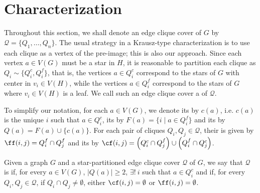 \section{Characterization}

Throughout this section, we shall denote an edge clique cover of $G$ by $\mathcal{Q} = \{Q_1, \dots, Q_n\}$.
The usual strategy in a Krausz-type characterization is to use each clique as a vertex of the pre-image; this is also our approach.
Since each vertex $a \in V(G)$ must be a star in $H$, it is reasonable to partition each clique as $Q_i \sim \{Q_i^c, Q_i^f\}$, that is, the vertices $a \in Q_i^c$ correspond to the stars of $G$ with center in $v_i \in V(H)$, while the vertices $a \in Q_i^f$ correspond to the stars of $G$ where $v_i \in V(H)$ is a leaf.
We call such an edge clique cover a  of $\mathcal{Q}$.

To simplify our notation, for each $a \in V(G)$, we denote its  by $c(a)$, i.e. $c(a)$ is the unique $i$ such that $a \in Q_i^c$, its  by $F(a) = \{i \mid a \in Q_i^f\}$ and its  by $Q(a) = F(a) \cup \{c(a)\}$. For each pair of cliques $Q_i, Q_j \in \mathcal{Q}$, their  is given by $\ff(i,j) = Q_i^f \cap Q_j^f$ and its  by $\cf(i,j) = \left(Q_i^c \cap Q_j^f\right) \cup \left(Q_i^f \cap Q_j^c\right)$.

\begin{definition}
    Given a graph $G$ and a star-partitioned edge clique cover $\mathcal{Q}$ of $G$, we say that $\mathcal{Q}$ is  if, for every $a \in V(G)$, $|Q(a)| \geq 2$, $\exists!\ i$ such that $a \in Q_i^c$ and if, for every $Q_i, Q_j \in \mathcal{Q}$, if $Q_i \cap Q_j \neq \emptyset$, either $\cf(i,j) = \emptyset$ or $\ff(i,j) = \emptyset$.
\end{definition}


